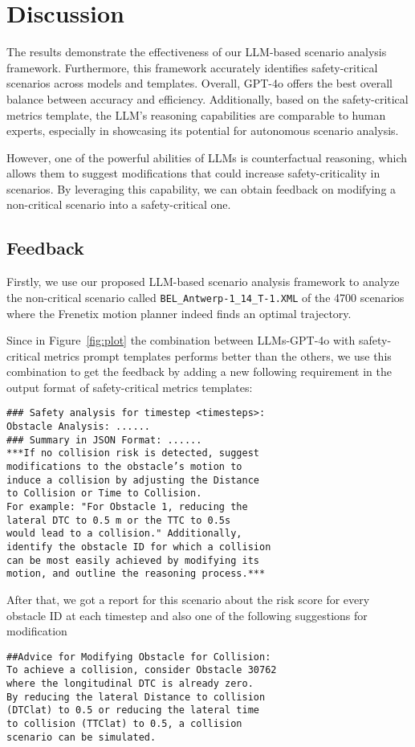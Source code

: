\section{Discussion}
\label{sec:discussion}
The results demonstrate the effectiveness of our LLM-based scenario analysis framework. Furthermore, this framework accurately identifies safety-critical scenarios across models and templates. Overall, GPT-4o offers the best overall balance between accuracy and efficiency.
Additionally, based on the safety-critical metrics template, the LLM's reasoning capabilities are comparable to human experts, especially in showcasing its potential for autonomous scenario analysis.

However, one of the powerful abilities of LLMs is counterfactual reasoning, which allows them to suggest modifications that could increase safety-criticality in scenarios. By leveraging this capability, we can obtain feedback on modifying a non-critical scenario into a safety-critical one.

\subsection{Feedback}
Firstly, we use our proposed LLM-based scenario analysis framework to analyze the non-critical scenario called \texttt{BEL\_Antwerp-1\_14\_T-1.XML} of the 4700 scenarios where the Frenetix motion planner indeed finds an optimal trajectory.

Since in Figure~\ref{fig:plot} the combination between LLMs-GPT-4o with safety-critical metrics prompt templates performs better than the others,  we use this combination to get the feedback by adding a new following requirement in the output format of safety-critical metrics templates:
{\small
\begin{verbatim}
### Safety analysis for timestep <timesteps>: 
Obstacle Analysis: ......
### Summary in JSON Format: ......
***If no collision risk is detected, suggest 
modifications to the obstacle’s motion to 
induce a collision by adjusting the Distance
to Collision or Time to Collision. 
For example: "For Obstacle 1, reducing the 
lateral DTC to 0.5 m or the TTC to 0.5s 
would lead to a collision." Additionally, 
identify the obstacle ID for which a collision 
can be most easily achieved by modifying its 
motion, and outline the reasoning process.***
\end{verbatim}
}
After that, we got a report for this scenario about the risk score for every obstacle ID at each timestep and also one of the following suggestions for modification
{\small
\begin{verbatim}
##Advice for Modifying Obstacle for Collision:
To achieve a collision, consider Obstacle 30762
where the longitudinal DTC is already zero. 
By reducing the lateral Distance to collision 
(DTClat) to 0.5 or reducing the lateral time 
to collision (TTClat) to 0.5, a collision 
scenario can be simulated.
\end{verbatim}
}
